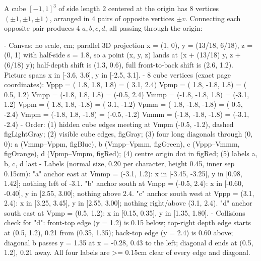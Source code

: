 \begin{content}
A cube $[-1, 1]^3$ of side length $2$ centered at the origin has $8$ vertices $(\pm 1, \pm 1, \pm 1)$, arranged in $4$ pairs of opposite vertices $\pm v$. Connecting each opposite pair produces $4$  $a, b, c, d$, all passing through the origin:

\begin{hidden}
- Canvas: no scale, cm; parallel 3D projection x = (1, 0), y = (13/18, 6/18), z = (0, 1) with half-side s = 1.8,
  so a point (x, y, z) lands at (x + (13/18) y, z + (6/18) y); half-depth shift is (1.3, 0.6), full front-to-back shift is (2.6, 1.2).
  Picture spans x in [-3.6, 3.6], y in [-2.5, 3.1].
- 8 cube vertices (exact page coordinates):
  Vppp = ( 1.8,  1.8,  1.8) = ( 3.1,  2.4)   Vpmp = ( 1.8, -1.8,  1.8) = ( 0.5,  1.2)
  Vmpp = (-1.8,  1.8,  1.8) = (-0.5,  2.4)   Vmmp = (-1.8, -1.8,  1.8) = (-3.1,  1.2)
  Vppm = ( 1.8,  1.8, -1.8) = ( 3.1, -1.2)   Vpmm = ( 1.8, -1.8, -1.8) = ( 0.5, -2.4)
  Vmpm = (-1.8,  1.8, -1.8) = (-0.5, -1.2)   Vmmm = (-1.8, -1.8, -1.8) = (-3.1, -2.4)
- Order: (1) hidden cube edges meeting at Vmpm (-0.5, -1.2), dashed figLightGray; (2) visible cube edges, figGray;
  (3) four long diagonals through (0, 0): a (Vmmp--Vppm, figBlue), b (Vmpp--Vpmm, figGreen), c (Vppp--Vmmm, figOrange),
  d (Vpmp--Vmpm, figRed); (4) centre origin dot in figRed; (5) labels a, b, c, d last
- Labels (normal size, 0.20 per character, height 0.45, inner sep 0.15cm):
  "a" anchor east at Vmmp = (-3.1, 1.2): x in [-3.45, -3.25], y in [0.98, 1.42]; nothing left of -3.1.
  "b" anchor south at Vmpp = (-0.5, 2.4): x in [-0.60, -0.40], y in [2.55, 3.00]; nothing above 2.4.
  "c" anchor south west at Vppp = (3.1, 2.4): x in [3.25, 3.45], y in [2.55, 3.00]; nothing right/above (3.1, 2.4).
  "d" anchor south east at Vpmp = (0.5, 1.2): x in [0.15, 0.35], y in [1.35, 1.80].
- Collisions check for "d":
  front-top edge (y = 1.2) is 0.15 below; top-right depth edge starts at (0.5, 1.2), 0.21 from (0.35, 1.35);
  back-top edge (y = 2.4) is 0.60 above; diagonal b passes y = 1.35 at x = -0.28, 0.43 to the left;
  diagonal d ends at (0.5, 1.2), 0.21 away. All four labels are >= 0.15cm clear of every edge and diagonal.
\end{hidden}
\begin{center}
\end{center}
\end{content}
